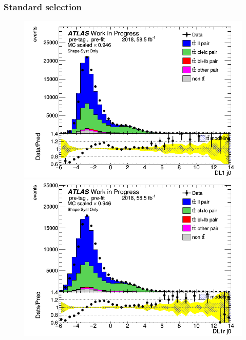 \documentclass[letterpaper,12pt]{article}
\begin{document}
\subsubsection{Standard selection}
\label{sec:appendix_standard_selection}
\begin{figure}[H]
\begin{minipage}[b]{.45\textwidth}
\centering
\includegraphics[width=1\textwidth]{Distribution_March/DataMC_J0_DL1.png}
\end{minipage}\hfill
\begin{minipage}[b]{.45\textwidth}
\centering
\includegraphics[width=1\textwidth]{Distribution_March/DataMC_J0_DL1r.png}
\end{minipage}\hfill
\begin{minipage}[b]{.45\textwidth}

\end{minipage}
\end{figure}
\end{document}
